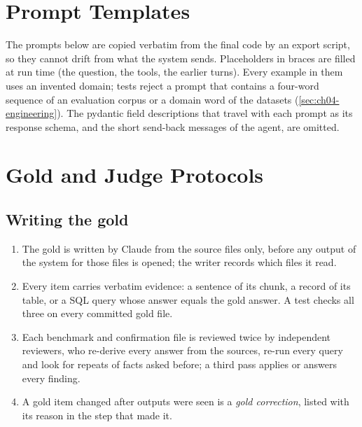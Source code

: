 
\chapter{Prompt Templates}\label{app:prompt-templates}

The prompts below are copied verbatim from the final code by an export script, so they cannot drift from what the
system sends. Placeholders in braces are filled at run time (the question, the tools, the earlier turns). Every
example in them uses an invented domain; tests reject a prompt that contains a four-word sequence of an evaluation
corpus or a domain word of the datasets (\cref{sec:ch04-engineering}). The pydantic field descriptions that travel
with each prompt as its response schema, and the short send-back messages of the agent, are omitted.



\chapter{Gold and Judge Protocols}\label{app:gold-and-judge-protocols}

\section*{Writing the gold}
\begin{enumerate}[nosep]
\item The gold is written by Claude from the source files only, before any output of the system for those files is
opened; the writer records which files it read.
\item Every item carries verbatim evidence: a sentence of its chunk, a record of its table, or a SQL query whose
answer equals the gold answer. A test checks all three on every committed gold file.
\item Each benchmark and confirmation file is reviewed twice by independent reviewers, who re-derive every answer from
the sources, re-run every query and look for repeats of facts asked before; a third pass applies or answers every
finding.
\item A gold item changed after outputs were seen is a \emph{gold correction}, listed with its reason in the step that
made it.
\end{enumerate}


